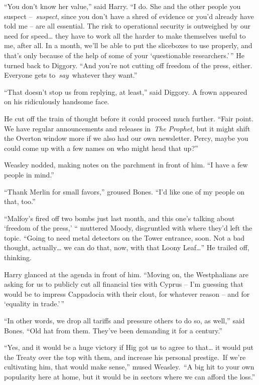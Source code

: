 ``You don't know her value,'' said Harry. ``I do. She and the other
people you suspect --~\emph{suspect}, since you don't have a shred of
evidence or you'd already have told me -- are all essential. The risk to
operational security is outweighed by our need for speed\ldots{} they
have to work all the harder to make themselves useful to me, after all.
In a month, we'll be able to put the sliceboxes to use properly, and
that's only because of the help of some of your `questionable
researchers.'\,'' He turned back to Diggory. ``And you're not cutting
off freedom of the press, either. Everyone gets to~\emph{say}~whatever
they want.''

``That doesn't stop us from replying, at least,'' said Diggory. A frown
appeared on his ridiculously handsome face.

He cut off the train of thought before it could proceed much further.
``Fair point. We have regular announcements and releases in~\emph{The
Prophet}, but it might shift the Overton window more if we also had our
own newsletter. Percy, maybe you could come up with a few names on who
might head that up?''

Weasley nodded, making notes on the parchment in front of him. ``I have
a few people in mind.''

``Thank Merlin for small favors,'' groused Bones. ``I'd like one of my
people on that, too.''

``Malfoy's fired off two bombs just last month, and this one's talking
about `freedom of the press,' `` muttered Moody, disgruntled with where
they'd left the topic. ``Going to need metal detectors on the Tower
entrance, soon. Not a bad thought, actually\ldots{} we can do that, now,
with that Loony Leaf\ldots{}'' He trailed off, thinking.

Harry glanced at the agenda in front of him. ``Moving on, the
Westphalians are asking for us to publicly cut all financial ties with
Cyprus -- I'm guessing that would be to impress Cappadocia with their
clout, for whatever reason -- and for `equality in trade.'\,''

``In other words, we drop all tariffs and pressure others to do so, as
well,'' said Bones. ``Old hat from them. They've been demanding it for a
century.''

``Yes, and it would be a huge victory if Hig got us to agree to
that\ldots{} it would put the Treaty over the top with them, and
increase his personal prestige.~If we're cultivating him, that would
make sense,'' mused Weasley.~``A big hit to your own popularity here at
home, but it would be in sectors where we can afford the loss.''

